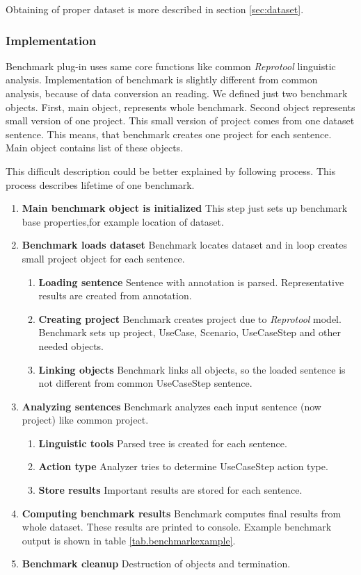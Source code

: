 Obtaining of proper dataset is more described in section \ref{sec:dataset}. 

\subsubsection{Implementation}
Benchmark plug-in uses same core functions like common \emph{Reprotool} linguistic analysis. Implementation of benchmark is slightly different from common analysis, because of data conversion an reading. We defined just two benchmark objects. First, main object, represents whole benchmark. Second object represents small version of one project. This small version of project comes from one dataset sentence. This means, that benchmark creates one project for each sentence. Main object contains list of these objects.

This difficult description could be better explained by following process. This process describes lifetime of one benchmark.

\begin{enumerate}
\item {\bf Main benchmark object is initialized} This step just sets up benchmark base properties,for example location of dataset.

\item {\bf Benchmark loads dataset} Benchmark locates dataset and in loop creates small project object for each sentence.
    \begin{enumerate}
    \item {\bf Loading sentence} Sentence with annotation is parsed. Representative results are created from annotation.
    \item {\bf Creating project} Benchmark creates project due to \emph{Reprotool} model. Benchmark sets up project, UseCase, Scenario, UseCaseStep and other needed objects.
    \item {\bf Linking objects} Benchmark links all objects, so the loaded sentence is not different from common UseCaseStep sentence.
    \end{enumerate}

\item {\bf Analyzing sentences} Benchmark analyzes each input sentence (now project)  like common project.
    \begin{enumerate}
    \item {\bf Linguistic tools} Parsed tree is created for each sentence.
    \item {\bf Action type} Analyzer tries to determine UseCaseStep action type.
    \item {\bf Store results} Important results are stored for each sentence.
    \end{enumerate}
\item {\bf Computing benchmark results} Benchmark computes final results from whole dataset. These results are printed to console. Example benchmark output is shown in table \ref{tab.benchmarkexample}.
\item {\bf Benchmark cleanup} Destruction of objects and termination.
\end{enumerate}

